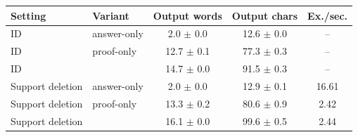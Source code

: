 \begin{tabular}{llccc}
\toprule
Setting & Variant & Output words & Output chars & Ex./sec. \\
\midrule
ID & answer-only & 2.0 $\pm$ 0.0 & 12.6 $\pm$ 0.0 & -- \\
ID & proof-only & 12.7 $\pm$ 0.1 & 77.3 $\pm$ 0.3 & -- \\
ID & \model{} & 14.7 $\pm$ 0.0 & 91.5 $\pm$ 0.3 & -- \\
Support deletion & answer-only & 2.0 $\pm$ 0.0 & 12.9 $\pm$ 0.1 & 16.61 \\
Support deletion & proof-only & 13.3 $\pm$ 0.2 & 80.6 $\pm$ 0.9 & 2.42 \\
Support deletion & \model{} & 16.1 $\pm$ 0.0 & 99.6 $\pm$ 0.5 & 2.44 \\
\bottomrule
\end{tabular}